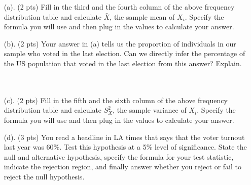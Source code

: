 \documentclass{./../../Latex/tests}
\begin{document}
 \begin{enumerate}
 \item[(a).] (2 pts) Fill in the third and the fourth column of the above frequency distribution table and calculate $\bar{X}$,  the sample mean of $X_i$. Specify the formula you will use and then plug in the values to calculate your answer. 
\newpage
\item[(b).] (2 pts) Your answer in (a) tells us the proportion of individuals in our sample who voted in the last election. Can we directly infer the percentage of the US population that voted in the last election from this answer? Explain. \\~\\
\vspace{5.5cm} \\
\item[(c).] (2 pts) Fill in the fifth and the sixth column of the above frequency distribution table and calculate $S^2_X$,  the sample variance of $X_i$. Specify the formula you will use and then plug in the values to calculate your answer. 
\newpage
\item[(d).] (3 pts) You read a headline in LA times that says that the voter turnout last year was 60\%. Test this hypothesis at a 5\% level of significance. State the null and alternative hypothesis, specify the formula for your test statistic, indicate the rejection region, and finally answer whether you reject or fail to reject the null hypothesis. 
\vspace{5cm}
\end{enumerate}

\end{document}
